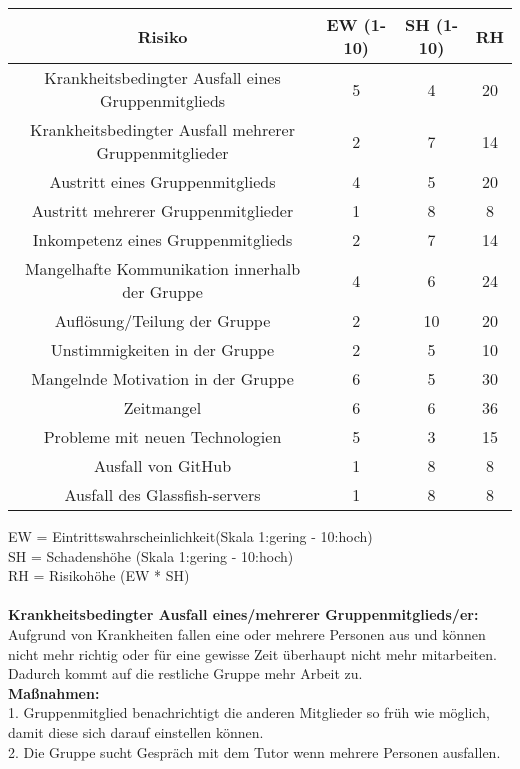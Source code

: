 \documentclass[fontsize=12pt,paper=a4,twoside]{scrartcl}
\begin{document}
\begin{center}
\begin{tabular}{|c|c|c|c|} \hline
Risiko & EW (1-10) & SH (1-10) & RH\\ \hline
Krankheitsbedingter Ausfall eines Gruppenmitglieds & 5  & 4 & 20\\ \hline
Krankheitsbedingter Ausfall mehrerer Gruppenmitglieder & 2  & 7 & 14\\ \hline
Austritt eines Gruppenmitglieds & 4 & 5 & 20\\ \hline
Austritt mehrerer Gruppenmitglieder & 1 & 8 & 8\\ \hline
Inkompetenz eines Gruppenmitglieds & 2 & 7 & 14\\ \hline
Mangelhafte Kommunikation innerhalb der Gruppe & 4 & 6 & 24\\ \hline
Auflösung/Teilung der Gruppe & 2 & 10 & 20\\ \hline
Unstimmigkeiten in der Gruppe & 2 & 5 & 10\\ \hline
Mangelnde Motivation in der Gruppe & 6 & 5 & 30\\ \hline
Zeitmangel & 6 & 6 & 36\\ \hline
Probleme mit neuen Technologien & 5 & 3 & 15\\ \hline
Ausfall von GitHub & 1 & 8 & 8\\ \hline
Ausfall des Glassfish-servers & 1 & 8 & 8\\ \hline
\end{tabular}
\end{center}
EW = Eintrittswahrscheinlichkeit(Skala 1:gering - 10:hoch)\\
SH = Schadenshöhe (Skala 1:gering - 10:hoch)\\
RH = Risikohöhe (EW * SH)\\
\bigskip \\
\textbf{Krankheitsbedingter Ausfall eines/mehrerer Gruppenmitglieds/er:}\\
Aufgrund von Krankheiten fallen eine oder mehrere Personen aus und können nicht mehr richtig oder für eine gewisse Zeit überhaupt nicht mehr mitarbeiten. Dadurch kommt auf die restliche Gruppe mehr Arbeit zu.\\
\textbf{Maßnahmen:}\\
1. Gruppenmitglied benachrichtigt die anderen Mitglieder so früh wie möglich, damit diese sich darauf einstellen können.\\
2. Die Gruppe sucht Gespräch mit dem Tutor wenn mehrere Personen ausfallen.\\
\bigskip \\
\end{document}
